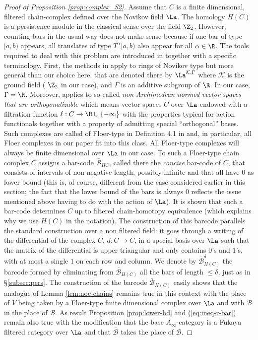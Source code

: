 \begin{proof}[Proof of Proposition \ref{prop:complex_S2}]
Assume that $C$ is a finite dimensional, filtered chain-complex defined over the Novikov field  $\La$.  The homology $H(C)$ is a persistence module in the classical sense over the field $\Z_{2}$.  However, counting bars in the usual way does not make sense because if one bar of type $[a,b)$ appears, all translates of type $T^{\alpha}[a,b)$ also appear for all $\alpha\in\R$.  The tools required to deal with this problem are introduced in \cite{Usher-Zhang:perh} together with a specific terminology.  First, the methods in 
\cite{Usher-Zhang:perh} apply to rings of Novikov type but more general than our choice here, that are denoted there by $\La^{\mathcal{K},\Gamma}$ where $\mathcal{K}$ is the ground field ( $\Z_{2}$ in our case), and $\Gamma$ is an additive subgroup of $\R$. In our case, $\Gamma=\R$. Moreover, \cite{Usher-Zhang:perh} applies to so-called {\em non-Archimedean normed vector spaces that are orthogonalizable} which means vector spaces $C$ over $\La$ endowed with a filtration function $\ell :C\to \R\cup \{-\infty\}$ with the properties typical for action functionals together with a property of admitting special ``orthogonal'' bases. Such complexes are called of Floer-type  in  Definition 4.1 in \cite{Usher-Zhang:perh} and, in particular, all Floer complexes in our paper fit into this class.  All Floer-type complexes   will always be finite dimensional over $\La$ in our case. To such a Floer-type chain complex $C$ \cite{Usher-Zhang:perh} assigns
a bar-code $\bar{\mathcal{B}}_{HC}$, called there the {\em concise} bar-code of $C$, that consists
of intervals of non-negative length, possibly infinite and that all have $0$ as
lower bound (this is, of course, different from the case considered earlier in this section; the fact that the lower bound of the bars is always $0$ reflects  the issue mentioned above having to do with the action of $\La$). It is shown that such a bar-code determines $C$ up to filtered chain-homotopy equivalence (which explains why we use $H(C)$ in the notation). The construction of this barcode parallels the standard construction over a non filtered field: it goes through a writing of the differential of the complex $C$, $d:C\to C$,
 in  a special basis over $\La$ such that the matrix of the differential is upper triangular and only contains $0$'s and $1$'s, with at most a single $1$ on each row and column.  We denote by $\bar{\mathcal{B}}^{\delta}_{H(C)}$ the 
barcode formed by eliminating from $\bar{\mathcal{B}}_{H(C)}$ all
the bars of length $\leq\delta$, just as in  \S\ref{subsec:pers}. The construction of the barcode $\bar{\mathcal{B}}_{H(C)}$ easily shows that the analogue of 
Lemma \ref{lem:noc-chains} remains true in this context with the place of 
$V$ being taken by a Floer-type finite dimensional complex over $\La$ and 
with $\bar{\mathcal{B}}$ in the place of $\mathcal{B}$. As result 
 Proposition \ref{prop:lower-bd}  and (\ref{eq:ineq-r-bar}) remain also true
 with the  modification that the base $A_{\infty}$-category is a Fukaya
 filtered category  over $\La$ and that $\bar{\mathcal{B}}$ takes the place of $\mathcal{B}$. 
 

\end{proof}
